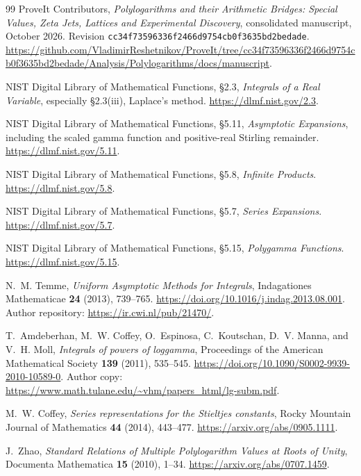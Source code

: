 \documentclass[11pt,letterpaper]{article}
\numberwithin{equation}{section}
\theoremstyle{plain}
\theoremstyle{definition}
\theoremstyle{remark}
\newcommand{\src}[1]{\nolinkurl{#1}}
\begin{document}
\begin{thebibliography}{99}
ProveIt Contributors,
\emph{Polylogarithms and their Arithmetic Bridges: Special Values,
Zeta Jets, Lattices and Experimental Discovery},
consolidated manuscript, October 2026.
Revision \src{cc34f73596336f2466d9754cb0f3635bd2bedade}.
\url{https://github.com/VladimirReshetnikov/ProveIt/tree/cc34f73596336f2466d9754cb0f3635bd2bedade/Analysis/Polylogarithms/docs/manuscript}.

NIST Digital Library of Mathematical Functions,
\S2.3, \emph{Integrals of a Real Variable}, especially
\S2.3(iii), Laplace's method.
\url{https://dlmf.nist.gov/2.3}.

NIST Digital Library of Mathematical Functions,
\S5.11, \emph{Asymptotic Expansions}, including the scaled gamma
function and positive-real Stirling remainder.
\url{https://dlmf.nist.gov/5.11}.

NIST Digital Library of Mathematical Functions,
\S5.8, \emph{Infinite Products}.
\url{https://dlmf.nist.gov/5.8}.

NIST Digital Library of Mathematical Functions,
\S5.7, \emph{Series Expansions}.
\url{https://dlmf.nist.gov/5.7}.

NIST Digital Library of Mathematical Functions,
\S5.15, \emph{Polygamma Functions}.
\url{https://dlmf.nist.gov/5.15}.

N.~M. Temme,
\emph{Uniform Asymptotic Methods for Integrals},
Indagationes Mathematicae \textbf{24} (2013), 739--765.
\url{https://doi.org/10.1016/j.indag.2013.08.001}.
Author repository: \url{https://ir.cwi.nl/pub/21470/}.

T.~Amdeberhan, M.~W. Coffey, O.~Espinosa, C.~Koutschan,
D.~V. Manna, and V.~H. Moll,
\emph{Integrals of powers of loggamma},
Proceedings of the American Mathematical Society \textbf{139}
(2011), 535--545.
\url{https://doi.org/10.1090/S0002-9939-2010-10589-0}.
Author copy: \url{https://www.math.tulane.edu/~vhm/papers_html/lg-subm.pdf}.

M.~W. Coffey, \emph{Series representations for the Stieltjes constants},
Rocky Mountain Journal of Mathematics \textbf{44} (2014), 443--477.
\url{https://arxiv.org/abs/0905.1111}.

J.~Zhao,
\emph{Standard Relations of Multiple Polylogarithm Values at Roots of Unity},
Documenta Mathematica \textbf{15} (2010), 1--34.
\url{https://arxiv.org/abs/0707.1459}.
\end{thebibliography}
\end{document}
